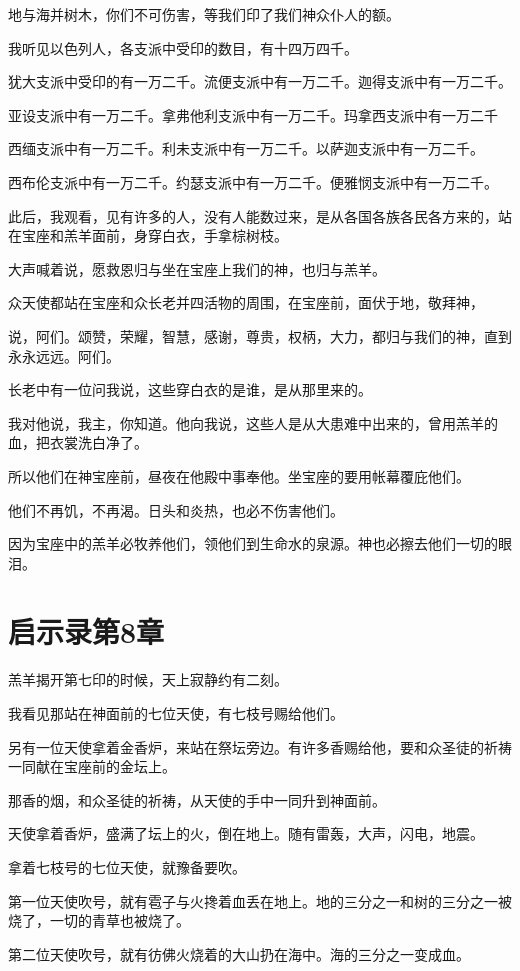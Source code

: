 \documentclass[12pt,oneside]{book}
\begin{document}
地与海并树木，你们不可伤害，等我们印了我们神众仆人的额。

我听见以色列人，各支派中受印的数目，有十四万四千。

犹大支派中受印的有一万二千。流便支派中有一万二千。迦得支派中有一万二千。

亚设支派中有一万二千。拿弗他利支派中有一万二千。玛拿西支派中有一万二千

西缅支派中有一万二千。利未支派中有一万二千。以萨迦支派中有一万二千。

西布伦支派中有一万二千。约瑟支派中有一万二千。便雅悯支派中有一万二千。

此后，我观看，见有许多的人，没有人能数过来，是从各国各族各民各方来的，站在宝座和羔羊面前，身穿白衣，手拿棕树枝。

大声喊着说，愿救恩归与坐在宝座上我们的神，也归与羔羊。

众天使都站在宝座和众长老并四活物的周围，在宝座前，面伏于地，敬拜神，

说，阿们。颂赞，荣耀，智慧，感谢，尊贵，权柄，大力，都归与我们的神，直到永永远远。阿们。

长老中有一位问我说，这些穿白衣的是谁，是从那里来的。

我对他说，我主，你知道。他向我说，这些人是从大患难中出来的，曾用羔羊的血，把衣裳洗白净了。

所以他们在神宝座前，昼夜在他殿中事奉他。坐宝座的要用帐幕覆庇他们。

他们不再饥，不再渴。日头和炎热，也必不伤害他们。

因为宝座中的羔羊必牧养他们，领他们到生命水的泉源。神也必擦去他们一切的眼泪。

\chapter{启示录第8章}
羔羊揭开第七印的时候，天上寂静约有二刻。

我看见那站在神面前的七位天使，有七枝号赐给他们。

另有一位天使拿着金香炉，来站在祭坛旁边。有许多香赐给他，要和众圣徒的祈祷一同献在宝座前的金坛上。

那香的烟，和众圣徒的祈祷，从天使的手中一同升到神面前。

天使拿着香炉，盛满了坛上的火，倒在地上。随有雷轰，大声，闪电，地震。

拿着七枝号的七位天使，就豫备要吹。

第一位天使吹号，就有雹子与火搀着血丢在地上。地的三分之一和树的三分之一被烧了，一切的青草也被烧了。

第二位天使吹号，就有彷佛火烧着的大山扔在海中。海的三分之一变成血。
\end{document}

